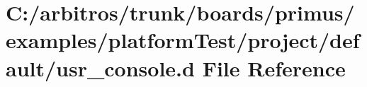 \hypertarget{platform_test_2project_2default_2usr__console_8d}{\section{C\-:/arbitros/trunk/boards/primus/examples/platform\-Test/project/default/usr\-\_\-console.d File Reference}
\label{platform_test_2project_2default_2usr__console_8d}
}
